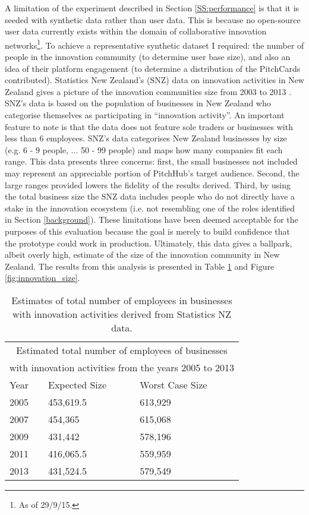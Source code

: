 A limitation of the experiment described in Section \ref{SS:performance} is that it is seeded with synthetic data rather than user data. This is because no open-source user data currently exists within the domain of collaborative innovation networks\footnote{As of 29/9/15.}. To achieve a representative synthetic dataset I required: the number of people in the innovation community (to determine user base size), and also an idea of their platform engagement (to determine a distribution of the PitchCards contributed). Statistics New Zealand's (SNZ) data on innovation activities in New Zealand gives a picture of the innovation communities size from 2003 to 2013 \cite{Innov5:online}. 
SNZ's data is based on the population of businesses in New Zealand who categorise themselves as participating in ``innovation activity''. An important feature to note is that the data does not feature sole traders or businesses with less than 6 employees. SNZ's data categorises New Zealand businesses by size (e.g. 6 - 9 people, ... 50 - 99 people) and maps how many companies fit each range. 
This data presents three concerns: first, the small businesses not included may represent an appreciable portion of PitchHub's target audience. Second, the large ranges provided lowers the fidelity of the results derived. Third, by using the total business size the SNZ data includes people who do not directly have a stake in the innovation ecosystem (i.e. not resembling one of the roles identified in Section \ref{background}). These limitations have been deemed acceptable for the purposes of this evaluation because the goal is merely to build confidence that the prototype could work in production. Ultimately, this data gives a ballpark, albeit overly high, estimate of the size of the innovation community in New Zealand. The results from this analysis is presented in Table \ref{tab:title} and Figure \ref{fig:innovation_size}.

\begin {table}[H]
\begin{center}
\begin{tabular}{ |p{2cm}||p{3cm}|p{3cm}|  }
 \hline
 \multicolumn{3}{|c|}{Estimated total number of employees of businesses}\\
 \multicolumn{3}{|c|}{with innovation activities from the years 2005 to 2013} \\
 \hline
 Year & Expected Size & Worst Case Size\\
 \hline
    2005 & 453,619.5 & 613,929\\
 \hline
    2007 & 454,365 & 615,068\\
 \hline
    2009 & 431,442 & 578,196\\
 \hline
    2011 & 416,065.5 & 559,959\\
 \hline
    2013 & 431,524.5 & 579,549\\
 \hline
\end{tabular}
\end{center}
\caption {Estimates of total number of employees in businesses with innovation activities derived from Statistics NZ data.} \label{tab:title} 
\end {table}

